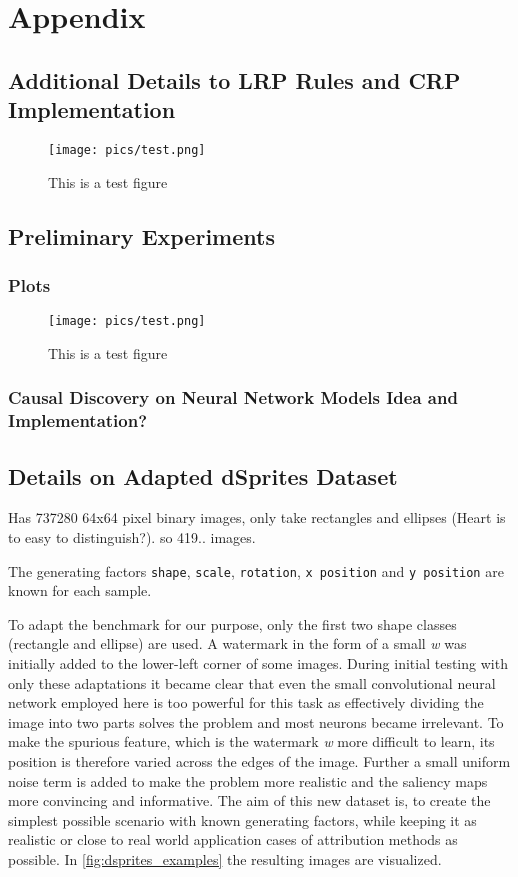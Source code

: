 \chapter{Appendix}\label{chapter:Appendix}


\section{Additional Details to LRP Rules and CRP Implementation}
\label{appendix:lrprules}
\begin{figure}[ht]
	\centering
	\label{fig:tesfigure}
	\texttt{[image: pics/test.png]}
	\caption[Test Figure]{This is a test figure}
\end{figure}

\section{Preliminary Experiments}
\subsection{Plots}
\begin{figure}[ht]
	\centering
	\label{fig:blafigure}
	\texttt{[image: pics/test.png]}
	\caption[Test Figure 2]{This is a test figure}
\end{figure}
\subsection{Causal Discovery on Neural Network Models Idea and Implementation?}


\section{Details on Adapted dSprites Dataset}\label{appendix:dsprites}
Has 737280 64x64 pixel binary images, only take rectangles and ellipses (Heart is to easy to distinguish?). so 419.. images.

The generating factors \verb|shape|, \verb|scale|, \verb|rotation|, \verb|x position| and \verb|y position| are known for each sample.

To adapt the benchmark for our purpose, only the first two shape classes (rectangle and ellipse) are used. A watermark in the form of a small \textit{w} was initially added to the lower-left corner of some images. During initial testing with only these adaptations it became clear that even the small convolutional neural network employed here is too powerful for this task as effectively dividing the image into two parts solves the problem and most neurons became irrelevant.
To make the spurious feature, which is the watermark \textit{w} more difficult to learn, its position is therefore varied across the edges of the image. Further a small uniform noise term is added to make the problem more realistic and the saliency maps more convincing and informative.
The aim of this new dataset is, to create the simplest possible scenario with known generating factors, while keeping it as realistic or close to real world application cases of attribution methods as possible. In \autoref{fig:dsprites_examples} the resulting images are visualized.

